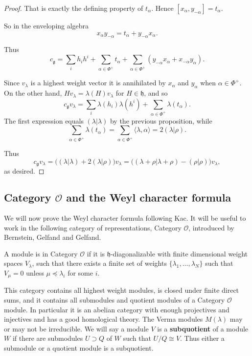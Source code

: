 \documentclass[12pt]{article}
\begin{document}
\begin{proof}
    That is exactly the defining property of $t_\alpha$. Hence
    $[x_\alpha,y_{-\alpha}] = t_\alpha$.

    So in the enveloping algebra
    \[
        x_\alpha y_{-\alpha} = t_\alpha + y_{-\alpha}x_\alpha.
    \]

    Thus
    \[
        c_{\mathfrak{g}} = \sum_i h_i h^i + \sum_{\alpha \in \Phi^+} t_\alpha
        + \sum_{\alpha \in \Phi^+} (y_{-\alpha}x_\alpha + x_{-\alpha}y_\alpha).
    \]

    Since $v_\lambda$ is a highest weight vector it is annihilated by $x_\alpha$ and $y_\alpha$
    when $\alpha \in \Phi^+$. On the other hand,
    $Hv_\lambda = \lambda(H)v_\lambda$ for $H \in \mathfrak{h}$, and so
    \[
        c_{\mathfrak{g}} v_\lambda
        = \sum_i \lambda(h_i)\lambda(h^i) + \sum_{\alpha \in \Phi^+} \lambda(t_\alpha).
    \]
    The first expression equals $(\lambda|\lambda)$ by the previous proposition, while
    \[
        \sum_{\alpha \in \Phi^+} \lambda(t_\alpha)
        = \sum_{\alpha \in \Phi^+} \langle \lambda, \alpha \rangle
        = 2(\lambda|\rho).
    \]

    Thus
    \[
        c_{\mathfrak{g}} v_\lambda
        = \big( (\lambda|\lambda) + 2(\lambda|\rho)\big) v_\lambda
        = \big( (\lambda+\rho|\lambda+\rho) - (\rho|\rho)\big)v_\lambda,
    \]
    as desired.
\end{proof}

\subsection{Category $\mathcal{O}$ and the Weyl character formula}
We will now prove the Weyl character formula following Kac. It will be useful to work in the following category of representations, Category $\mathcal{O}$, introduced by Bernstein, Gelfand and Gelfand.

\begin{definition}
    A module is in Category $\mathcal{O}$ if it is $\mathfrak{h}$-diagonalizable with finite dimensional weight spaces $V_\lambda$, such that there exists a finite set of weights $\{\lambda_1,\dots,\lambda_N\}$ such that $V_\mu = 0$ unless $\mu \preceq \lambda_i$ for some $i$.
\end{definition}

This category contains all highest weight modules, is closed under finite direct sums, and it contains all submodules and quotient modules of a Category $\mathcal{O}$ module. In particular it is an abelian category with enough projectives and injectives and has a good homological theory. The Verma modules $M(\lambda)$ may or may not be irreducible. We will say a module $V$ is a \textbf{subquotient} of a module $W$ if there are submodules $U \supset Q$ of $W$ such that $U/Q \cong V$. Thus either a submodule or a quotient module is a subquotient.
\end{document}
